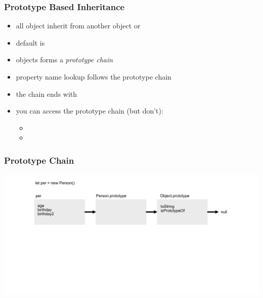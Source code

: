 \begin{frame}[fragile] \frametitle{Prototype Based Inheritance}

\begin{itemize}
  \item all object inherit from another object or 
  \item default is 
  \item objects forms a \emph{prototype chain}
  \item property name lookup follows the prototype chain
  \item the chain ends with 
  \item you can access the prototype chain (but don't):
  \begin{itemize}
    \item {}
    \item {}
  \end{itemize}
\end{itemize}
\end{frame}

\begin{frame}[fragile]
\frametitle{Prototype Chain}
  \centering
  \includegraphics[width=14cm]{img/prototype_chain}

\end{frame}

